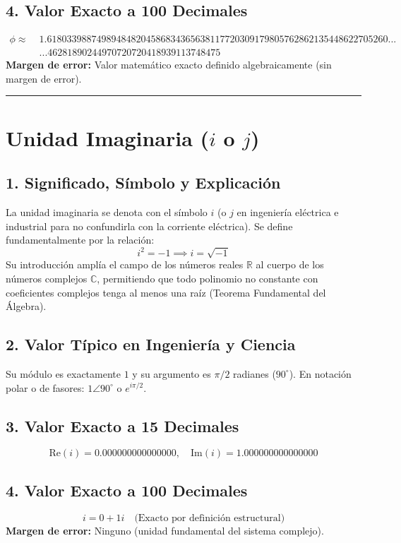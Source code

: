 \documentclass[12pt,a4paper]{article}
\begin{document}
\subsection*{4. Valor Exacto a 100 Decimales}
\begin{align*}
\phi \approx \; & 1.618033988749894848204586834365638117720309179805762862135448622705260... \\
& ...46281890244970720720418939113748475
\end{align*}
\textbf{Margen de error:} Valor matemático exacto definido algebraicamente (sin margen de error).

\vspace{0.8cm}
\hrule
\vspace{0.8cm}

\section{Unidad Imaginaria ($i$ o $j$)}

\subsection*{1. Significado, Símbolo y Explicación}
La unidad imaginaria se denota con el símbolo $i$ (o $j$ en ingeniería eléctrica e industrial para no confundirla con la corriente eléctrica). Se define fundamentalmente por la relación:
\begin{equation*}
i^2 = -1 \implies i = \sqrt{-1}
\end{equation*}
Su introducción amplía el campo de los números reales $\mathbb{R}$ al cuerpo de los números complejos $\mathbb{C}$, permitiendo que todo polinomio no constante con coeficientes complejos tenga al menos una raíz (Teorema Fundamental del Álgebra).

\subsection*{2. Valor Típico en Ingeniería y Ciencia}
Su módulo es exactamente $1$ y su argumento es $\pi/2$ radianes ($90^\circ$). En notación polar o de fasores: $1 \angle 90^\circ$ o $e^{i\pi/2}$.

\subsection*{3. Valor Exacto a 15 Decimales}
\begin{equation*}
\text{Re}(i) = 0.000000000000000, \quad \text{Im}(i) = 1.000000000000000
\end{equation*}

\subsection*{4. Valor Exacto a 100 Decimales}
\begin{equation*}
i = 0 + 1i \quad \text{(Exacto por definición estructural)}
\end{equation*}
\textbf{Margen de error:} Ninguno (unidad fundamental del sistema complejo).
\end{document}
